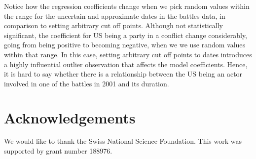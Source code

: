 \documentclass[
]{jss}
\begin{document}
Notice how the regression coefficients change when we pick random values
within the range for the uncertain and approximate dates in the battles
data, in comparison to setting arbitrary cut off points. Although not
statistically significant, the coefficient for US being a party in a
conflict change considerably, going from being positive to becoming
negative, when we we use random values within that range. In this case,
setting arbitrary cut off points to dates introduces a highly
influential outlier observation that affects the model coefficients.
Hence, it is hard to say whether there is a relationship between the US
being an actor involved in one of the battles in 2001 and its duration.

\hypertarget{acknowledgements}{%
\section{Acknowledgements}\label{acknowledgements}}

We would like to thank the Swiss National Science Foundation. This work
was supported by grant number 188976.

\renewcommand\refname{References}

\end{document}
